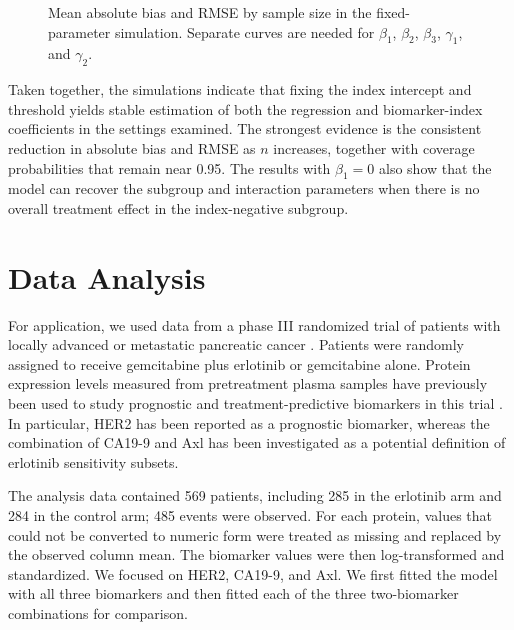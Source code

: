 \begin{figure}[!htbp]
\centering
{}
\caption[Estimation error by sample size]{Mean absolute bias and RMSE by
sample size in the fixed-parameter simulation. Separate curves are needed for
$\beta_1$, $\beta_2$, $\beta_3$, $\gamma_1$, and $\gamma_2$.}
\label{fig:simBiasByN}
\end{figure}

Taken together, the simulations indicate that fixing the index intercept and
threshold yields stable estimation of both the regression and biomarker-index
coefficients in the settings examined. The strongest evidence is the
consistent reduction in absolute bias and RMSE as $n$ increases, together
with coverage probabilities that remain near 0.95. The results with
$\beta_1=0$ also show that the model can recover the subgroup and interaction
parameters when there is no overall treatment effect in the index-negative
subgroup.

\section{Data Analysis}
\label{analysis}

For application, we used data from a phase III randomized trial of patients
with locally advanced or metastatic pancreatic cancer
\cite{doi:10.1200/JCO.2006.07.9525}. Patients were randomly assigned to
receive gemcitabine plus erlotinib or gemcitabine alone. Protein expression
levels measured from pretreatment plasma samples have previously been used to
study prognostic and treatment-predictive biomarkers in this trial
\cite{ShultzDavidB2016ANBP,HeYe2018AstC}. In particular, HER2 has been
reported as a prognostic biomarker, whereas the combination of CA19-9 and Axl
has been investigated as a potential definition of erlotinib sensitivity
subsets.

The analysis data contained 569 patients, including 285 in the erlotinib arm
and 284 in the control arm; 485 events were observed. For each protein, values
that could not be converted to numeric form were treated as missing and
replaced by the observed column mean. The biomarker values were then
log-transformed and standardized. We focused on HER2, CA19-9, and Axl. We
first fitted the model with all three biomarkers and then fitted each of the
three two-biomarker combinations for comparison.

